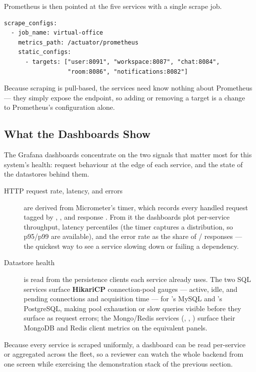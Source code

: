 Prometheus is then pointed at the five services with a single scrape job.

\begin{lstlisting}[caption={The Prometheus scrape job targeting the five services (\code{prometheus.yml}).}]
scrape_configs:
  - job_name: virtual-office
    metrics_path: /actuator/prometheus
    static_configs:
      - targets: ["user:8091", "workspace:8087", "chat:8084",
                  "room:8086", "notifications:8082"]
\end{lstlisting}

Because scraping is pull-based, the services need know nothing about Prometheus
--- they simply expose the endpoint, so adding or removing a target is a change to
Prometheus's configuration alone.

\subsection{What the Dashboards Show}

The Grafana dashboards concentrate on the two signals that matter most for this
system's health: request behaviour at the edge of each service, and the state of
the datastores behind them.

\begin{description}
  \item[HTTP request rate, latency, and errors] are derived from Micrometer's
   timer, which records every handled request tagged
  by , , and response . From it the dashboards
  plot per-service throughput, latency percentiles (the timer captures a
  distribution, so p95/p99 are available), and the error rate as the share of
  / responses --- the quickest way to see a service slowing
  down or failing a dependency.
  \item[Datastore health] is read from the persistence clients each service
  already uses. The two SQL services surface \textbf{HikariCP} connection-pool
  gauges --- active, idle, and pending connections and acquisition time --- for
  's MySQL and 's PostgreSQL, making pool exhaustion or
  slow queries visible before they surface as request errors; the Mongo/Redis
  services (, , ) surface their MongoDB and
  Redis client metrics on the equivalent panels.
\end{description}

Because every service is scraped uniformly, a dashboard can be read per-service or
aggregated across the fleet, so a reviewer can watch the whole backend from one
screen while exercising the demonstration stack of the previous section.

